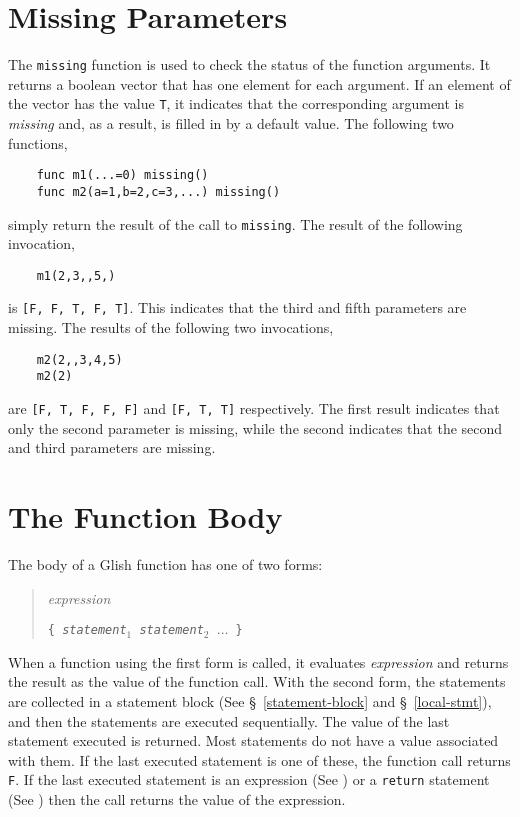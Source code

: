 
\section{Missing Parameters}
\label{missing-func}

The {\tt missing} function 
\label{missing-func-example}
is used to check the status of the function arguments. It returns
a boolean vector that has one element for each argument. If an element
of the vector has the value {\tt T}, it indicates that the corresponding
argument is {\em missing} and, as a result,  
is filled in by a default value. 
The following two functions,
\begin{verbatim}
    func m1(...=0) missing()
    func m2(a=1,b=2,c=3,...) missing()
\end{verbatim}
simply return the result of the call to {\tt missing}. The result of the
following invocation,
\begin{verbatim}
    m1(2,3,,5,)
\end{verbatim}
is {\tt [F, F, T, F, T]}. This indicates that the third and fifth 
parameters are  missing. The results of the following two invocations,
\begin{verbatim}
    m2(2,,3,4,5)
    m2(2)
\end{verbatim}
are {\tt [F, T, F, F, F]} and {\tt [F, T, T]} respectively. The first
result indicates that only the second parameter is missing, while the
second indicates that the second and third parameters are  missing.

\section{The Function Body}

The body of a Glish function has one of two forms:
\begin{quote}
    {\em expression}

    {\tt \{ {\em statement$_1$ statement$_2$ $\ldots$} \} }
\end{quote}
When a function using the first form is called, it evaluates {\em expression}
and returns the result as the value of the function call.  With the second
form, the statements are collected in a statement block (See 
\S~\ref{statement-block} and \S~\ref{local-stmt}), and then the
statements are executed sequentially. The value of the last statement executed
is returned.  Most statements
do not have a value associated with them.  If the last executed statement
is one of these, the function call returns {\tt F}.  If the last executed
statement is an expression (See ) or a {\tt return}
statement (See ) then the call returns
the value of the expression.

